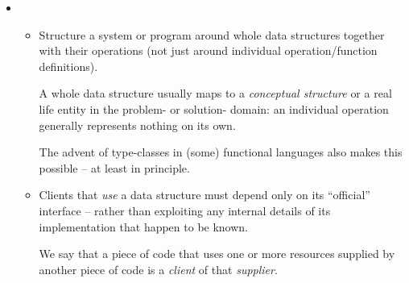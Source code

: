 \documentclass{ip3}
\begin{document}
\begin{foil}

\begin{itemize}
\item[]
\begin{itemize}

\item Structure a system or program around whole data structures
      together with their operations (not just around individual operation/function
      definitions).
      \begin{note} 
          A whole data structure usually maps to a \textit{conceptual
          structure} {or a real life entity} in the problem- or
          solution- domain: an individual operation generally
          represents nothing on its own.
\par          
          The advent of type-classes in (some) functional languages 
          also makes this possible -- at least in principle.
      \end{note}



\item Clients that \textit{use} a data structure must depend only on
      its ``official'' interface -- rather than exploiting any internal
      details of its implementation that happen to be known.
       \begin{note}
          We say that a piece of code that uses one or more resources supplied by another
          piece of code is a \textit{client} of that \textit{supplier}.
       \end{note}
\end{itemize}



\end{itemize}
\end{foil}
\end{document}
